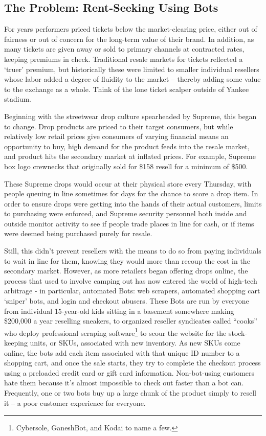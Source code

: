 \documentclass[runningheads]{llncs}
\begin{document}
\subsection{The Problem: Rent-Seeking Using Bots} 
For years performers priced tickets below the market-clearing price, either out of fairness or out of concern for the long-term value of their brand.\cite{4}   In addition, as many tickets are given away or sold to primary channels at contracted rates, keeping premiums in check. Traditional resale markets for tickets reflected a ‘truer’ premium, but historically these were limited to smaller individual resellers whose labor added a degree of fluidity to the market – thereby adding some value to the exchange as a whole.  Think of the lone ticket scalper outside of Yankee stadium.

Beginning with the streetwear drop culture spearheaded by Supreme, this began to change.  Drop products are priced to their target consumers, but while relatively low retail prices give consumers of varying financial means an opportunity to buy, high demand for the product feeds into the resale market, and product hits the secondary market at inflated prices. For example, Supreme box logo crewnecks that originally sold for \$158 resell for a minimum of \$500.\cite{5}

These Supreme drops would occur at their physical store every Thursday, with people queuing in line sometimes for days for the chance to score a drop item.  In order to ensure drops were getting into the hands of their actual customers, limits to purchasing were enforced, and Supreme security personnel both inside and outside monitor activity to see if people trade places in line for cash, or if items were deemed being purchased purely for resale.\cite{6}

Still, this didn’t prevent resellers with the means to do so from paying individuals to wait in line for them, knowing they would more than recoup the cost in the secondary market.
However, as more retailers began offering drops online, the process that used to involve camping out has now entered the world of high-tech arbitrage - in particular, automated Bots: web scrapers, automated shopping cart ‘sniper’ bots, and login and checkout abusers.\cite{3} These Bots are run by everyone from individual 15-year-old kids sitting in a basement somewhere making \$200,000 a year reselling sneakers, to organized reseller syndicates called “cooks” who deploy professional scraping software\footnote{Cybersole, GaneshBot, and Kodai to name a few.}  to scour the website for the stock-keeping units, or SKUs, associated with new inventory. As new SKUs come online, the bots add each item associated with that unique ID number to a shopping cart, and once the sale starts, they try to complete the checkout process using a preloaded credit card or gift card information. Non-bot-using customers hate them because it’s almost impossible to check out faster than a bot can. Frequently, one or two bots buy up a large chunk of the product simply to resell it – a poor customer experience for everyone.\cite{3}
\end{document}

